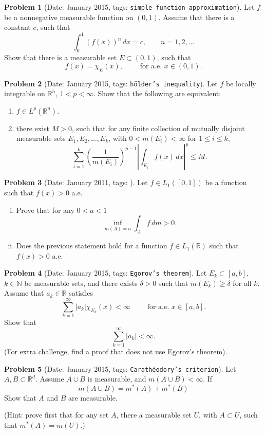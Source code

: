 \documentclass[11pt, notitlepage]{article}
\theoremstyle{definition}
\theoremstyle{definition}
\theoremstyle{definition}
\newtheorem{probstate}{Problem}
\theoremstyle{remark}
\newenvironment{problem}[2]{
    \begin{probstate}[Date: #1, tags: \texttt{#2}]
}
{
  \end{probstate}
}
\begin{document}
\begin{problem}{January 2015}{simple function approximation}
Let $f$ be a nonnegative measurable function on $(0,1)$. Assume that there is a constant $c$, such that
$$\int_0^1 (f(x))^n\,dx=c,\qquad n=1,2,\dots$$
Show that there is a measurable set $E\subset (0,1)$, such that
$$f(x)=\chi_E(x),\qquad \text{ for a.e. }  x\in(0,1).$$
\end{problem}

\begin{problem}{January 2015}{h\"older's inequality}
Let $f$ be locally integrable on $\mathbb R^n$, $1<p<\infty$. Show that the following are equivalent:

\begin{enumerate}[(1)]
    \item $f\in L^p(\mathbb R^n)$.
    \item there exist $M>0$, such that for any finite collection of mutually disjoint measurable sets $E_1, E_2,\dots, E_k$, with $0<m(E_i) <\infty$ for $1\le i\le k$, 
$$\sum_{i=1}^k \left(\frac1{m(E_i)}\right)^{p-1}\left|\int_{E_i} f(x)\,dx\right|^p\le M.$$
\end{enumerate}
\end{problem}

\begin{problem}{January 2011}{}
  Let $f \in L_1([0,1])$ be a function such that $f(x)>0$ a.e.
 \begin{enumerate}[(i)]
 \item Prove that for any $0<a<1$
 \[
   \inf_{m(A)=a} \int_A f \, dm >0.
 \]
 \item Does the previous statement hold for a function $f \in L_1(\mathbb R)$ such that $f(x)>0$ a.e.
 \end{enumerate}
\end{problem}

\begin{problem}{January 2015}{Egorov's theorem}
Let $E_k\subset [a,b]$, $k\in\mathbb N$ be measurable sets, and there exists $\delta>0$ such that $m(E_k)\ge \delta$ for all $k$.
 Assume that $a_k\in\mathbb R$ satisfies 
$$\sum_{k=1}^\infty |a_k|\chi_{E_k}(x)<\infty\qquad \text{ for a.e. }  x\in [a,b].$$
Show that
$$\sum_{k=1}^\infty |a_k|<\infty.$$
(For extra challenge, find a proof that does not use Egorov's theorem).
\end{problem}

\begin{problem}{January 2015}{Carath\'eodory's criterion}
Let $A, B\subset \mathbb R^d$. Assume $A\cup B$ is measurable, and $m(A\cup B)<\infty$. If
$$m(A\cup B)=m^*(A)+m^*(B)$$
Show that $A$ and $B$ are measurable. 

(Hint: prove first that for any set $A$, there a measurable set $U$, with $A\subset U$, such that $m^*(A)=m(U)$.)
\end{problem}
\end{document}
